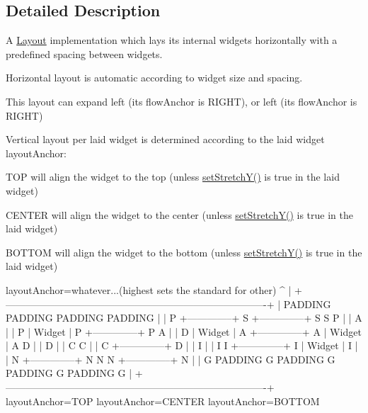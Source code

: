 \subsection{Detailed Description}
A \hyperlink{classcanvascv_1_1Layout}{Layout} implementation which lays it\textquotesingle{}s internal widgets horizontally with a predefined spacing between widgets.
\begin{DoxyItemize}
\item Horizontal layout is automatic according to widget size and spacing.
\begin{DoxyEnumerate}
\item This layout can expand left (it\textquotesingle{}s \textquotesingle{}flow\+Anchor\textquotesingle{} is R\+I\+G\+HT), or left (it\textquotesingle{}s \textquotesingle{}flow\+Anchor\textquotesingle{} is R\+I\+G\+HT)
\end{DoxyEnumerate}
\item Vertical layout per laid widget is determined according to the laid widget \textquotesingle{}layout\+Anchor\textquotesingle{}\+:
\begin{DoxyEnumerate}
\item T\+OP will align the widget to the top (unless \hyperlink{classcanvascv_1_1Widget_a3ef50b76d33c332cea4e632346b6df33}{set\+Stretch\+Y()} is true in the laid widget)
\item C\+E\+N\+T\+ER will align the widget to the center (unless \hyperlink{classcanvascv_1_1Widget_a3ef50b76d33c332cea4e632346b6df33}{set\+Stretch\+Y()} is true in the laid widget)
\item B\+O\+T\+T\+OM will align the widget to the bottom (unless \hyperlink{classcanvascv_1_1Widget_a3ef50b76d33c332cea4e632346b6df33}{set\+Stretch\+Y()} is true in the laid widget) \begin{DoxyVerb}       layoutAnchor=whatever...(highest sets the standard for other)
           ^
           |
   +-------------------------------------------------------------------------------+
   |       PADDING            PADDING            PADDING            PADDING        |
   | P +--------------+ S +--------------+ S                  S                  P |
   | A |              | P |    Widget    | P +--------------+ P                  A |
   | D |    Widget    | A +--------------+ A |    Widget    | A                  D |
   | D |              | C                  C |              | C +--------------+ D |
   | I |              | I                  I +--------------+ I |    Widget    | I |
   | N +--------------+ N                  N                  N +--------------+ N |
   | G     PADDING      G     PADDING      G     PADDING      G     PADDING      G |
   +-------------------------------------------------------------------------------+
                         layoutAnchor=TOP   layoutAnchor=CENTER layoutAnchor=BOTTOM
\end{DoxyVerb}
 
\end{DoxyEnumerate}
\end{DoxyItemize}

